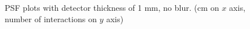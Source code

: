 \documentclass[a4paper]{article}
\begin{document}
\begin{figure}[H]
  \caption{PSF plots with detector thickness of 1 mm, no blur. (cm on $x$ axis, number of interactions on $y$ axis)}
  \label{fig:010_xs}
\end{figure}
\end{document}
